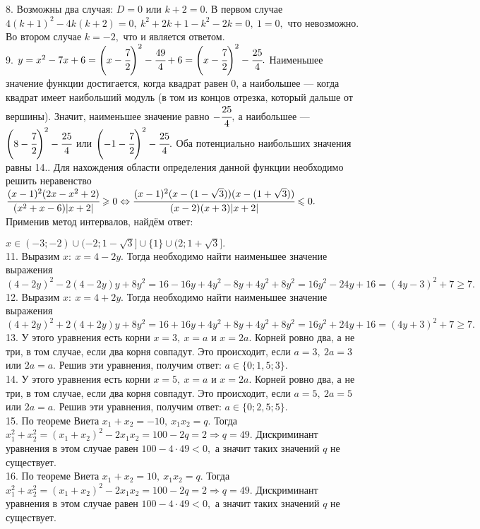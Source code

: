 8. Возможны два случая: $D=0$ или $k+2=0.$ В первом случае $4(k+1)^2-4k(k+2)=0,\ k^2+2k+1-k^2-2k=0,\ 1=0,$ что невозможно. Во втором случае $k=-2,$ что и является ответом.\\
9. $y=x^2-7x+6=\left(x-\cfrac{7}{2}\right)^2-\cfrac{49}{4}+6=\left(x-\cfrac{7}{2}\right)^2-\cfrac{25}{4}.$ Наименьшее значение функции достигается, когда квадрат равен 0, а наибольшее --- когда квадрат имеет наибольший модуль (в том из концов отрезка, который дальше от вершины). Значит, наименьшее значение равно $-\cfrac{25}{4},$ а наибольшее ---
$\left(8-\cfrac{7}{2}\right)^2-\cfrac{25}{4}$ или $\left(-1-\cfrac{7}{2}\right)^2-\cfrac{25}{4}.$ Оба потенциально наибольших значения равны 14.\newpage{}. Для нахождения области определения данной функции необходимо решить неравенство\\ $\cfrac{(x-1)^2(2x-x^2+2)}{(x^2+x-6)|x+2|}\geqslant0\Leftrightarrow
\cfrac{(x-1)^2(x-(1-\sqrt{3}))(x-(1+\sqrt{3}))}{(x-2)(x+3)|x+2|}\leqslant0.$ Применив метод интервалов, найдём ответ:
\begin{figure}[ht!]
\end{figure}
$x\in(-3;-2)\cup(-2;1-\sqrt{3}]\cup\{1\}\cup(2;1+\sqrt{3}].$\\
11. Выразим $x:\ x=4-2y.$ Тогда необходимо найти наименьшее значение выражения $(4-2y)^2-2(4-2y)y+8y^2=16-16y+4y^2-8y+4y^2+8y^2=
16y^2-24y+16=(4y-3)^2+7\geqslant7.$\\
12. Выразим $x:\ x=4+2y.$ Тогда необходимо найти наименьшее значение выражения $(4+2y)^2+2(4+2y)y+8y^2=16+16y+4y^2+8y+4y^2+8y^2=
16y^2+24y+16=(4y+3)^2+7\geqslant7.$\\
13. У этого уравнения есть корни $x=3,\ x=a$ и $x=2a.$ Корней ровно два, а не три, в том случае, если два корня совпадут. Это происходит, если $a=3,\ 2a=3$ или $2a=a.$ Решив эти уравнения, получим ответ: $a\in\{0; 1,5;3\}.$\\
14. У этого уравнения есть корни $x=5,\ x=a$ и $x=2a.$ Корней ровно два, а не три, в том случае, если два корня совпадут. Это происходит, если $a=5,\ 2a=5$ или $2a=a.$ Решив эти уравнения, получим ответ: $a\in\{0; 2,5;5\}.$\\
15. По теореме Виета $x_1+x_2=-10,\ x_1x_2=q.$ Тогда $x_1^2+x_2^2=(x_1+x_2)^2-2x_1x_2=100-2q=2\Rightarrow q=49.$ Дискриминант уравнения в этом случае равен $100-4\cdot49<0,$ а значит таких значений $q$ не существует.\\
16. По теореме Виета $x_1+x_2=10,\ x_1x_2=q.$ Тогда $x_1^2+x_2^2=(x_1+x_2)^2-2x_1x_2=100-2q=2\Rightarrow q=49.$ Дискриминант уравнения в этом случае равен $100-4\cdot49<0,$ а значит таких значений $q$ не существует.\\
